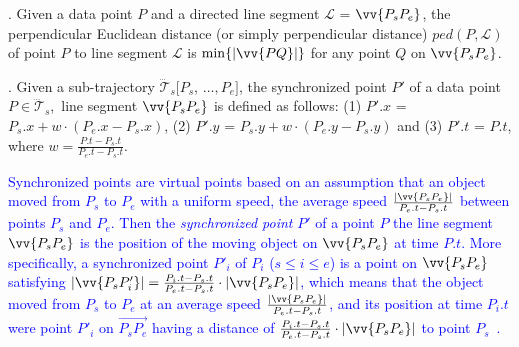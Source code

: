 

. Given a data point $P$ and a directed line segment $\mathcal{L}$ = $\vv{P_{s}P_{e}}$, the perpendicular Euclidean distance (or simply perpendicular distance) $ped(P, \mathcal{L})$ of point $P$ to line segment $\mathcal{L}$ is $\min\{|\vv{PQ}|\}$ for any point $Q$ on $\vv{P_{s}P_{e}}$.




. Given a sub-trajectory $\dddot{\mathcal{T}}_s[P_s$, $\ldots, P_e]$, the synchronized point $P'$ of a data point  $P \in \dddot{\mathcal{T}}_s$,~\wrt line segment $\vv{P_sP_e}$ is defined as follows:
(1) $P'.x$ = $P_s.x +  w\cdot(P_e.x - P_s.x)$,
(2) $P'.y$ = $P_s.y +  w\cdot(P_e.y - P_s.y)$ and
(3) $P'.t$ = $P.t$, where $w= \frac{P.t-P_s.t}{P_e.t-P_s.t}$.

\textcolor{blue}{Synchronized points are virtual points based on an assumption that an object moved from $P_s$ to $P_e$ with a uniform speed, \ie the average speed $\frac{|\vv{P_sP_e}|}{P_e.t-P_s.t}$ between points $P_s$ and $P_e$. Then the \emph{synchronized point} $P'$ of a point $P$ \wrt the line segment $\vv{P_sP_e}$ is the position of the moving object on $\vv{P_sP_e}$ at time $P.t$. More specifically, a synchronized point $P'_i$ of $P_i$ ($s\le i \le e$) is a point on $\vv{P_sP_{e}}$ satisfying ${|\vv{P_sP'_i}|} = \frac{P_i.t - P_s.t}{P_e.t - P_s.t}\cdot {|\vv{P_sP_e}|}$, which means that the object moved from $P_s$ to $P_e$ at an average speed $\frac{|\vv{P_sP_e}|}{P_e.t-P_s.t}$, and its position at time $P_i.t$ were point $P'_i$ on $\overrightarrow{P_sP_{e}}$ having a distance of $\frac{P_i.t - P_s.t}{P_e.t - P_s.t}\cdot|\vv{P_sP_e}|$ to point $P_s$~\cite{Meratnia:Spatiotemporal, Chen:Fast, Zhang:Evaluation}.}

